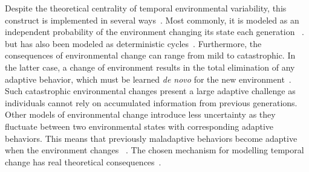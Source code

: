 \documentclass[letterpaper,11.5pt]{scrartcl}
\begin{document}
Despite the theoretical centrality of temporal environmental variability, this construct is
implemented in several ways~\cite{aoki2014evolution}. Most commonly, it is modeled
as an independent probability of the environment changing its state each
generation
~\cite{BoydRicherson1985,Rogers1988,Feldman1996,McElreath2005,Enquist2007,perreault2012bayesian,aoki2014evolution}.
but has also been modeled as deterministic cycles~\cite{Feldman1996, aoki2014evolution}.
Furthermore, the consequences of environmental change can range from mild to
catastrophic. In the latter case, a change of environment results in the total
elimination of any adaptive behavior, which must be learned \emph{de novo} for the
new environment~\cite{Rogers1988}. Such catastrophic environmental changes present
a large adaptive challenge as individuals cannot rely on accumulated information
from previous generations. Other models of environmental change introduce less
uncertainty as they fluctuate between two environmental states with corresponding
adaptive behaviors. This means that previously maladaptive
behaviors become adaptive when the environment changes
~\cite{perreault2012bayesian}. The chosen mechanism for modelling temporal
change has real theoretical consequences~\cite{aoki2014evolution}.
\end{document}
